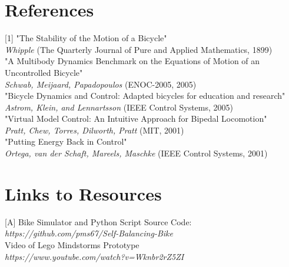 \documentclass[12pt]{article}
\begin{document}
\section*{References}

[1] "The Stability of the Motion of a Bicycle" \\
\textit{Whipple} (The Quarterly Journal of Pure and Applied Mathematics, 1899) \\

\noindent [2] "A Multibody Dynamics Benchmark on the Equations of Motion of an Uncontrolled Bicycle" \\
\textit{Schwab, Meijaard, Papadopoulos} (ENOC-2005, 2005) \\

\noindent [3] "Bicycle Dynamics and Control: Adapted bicycles for education and research" \\
\textit{Astrom, Klein, and Lennartsson} (IEEE Control Systems, 2005) \\

\noindent [4] "Virtual Model Control: An Intuitive Approach for Bipedal Locomotion" \\
\textit{Pratt, Chew, Torres, Dilworth, Pratt} (MIT, 2001) \\

\noindent [5] "Putting Energy Back in Control" \\
\textit{Ortega, van der Schaft, Mareels, Maschke} (IEEE Control Systems, 2001)

\section*{Links to Resources}

[A] Bike Simulator and Python Script Source Code: \\
\textit{https://github.com/pms67/Self-Balancing-Bike} \\

\noindent [B] Video of Lego Mindstorms Prototype \\
\textit{https://www.youtube.com/watch?v=Wknbr2rZ5ZI}
\end{document}
